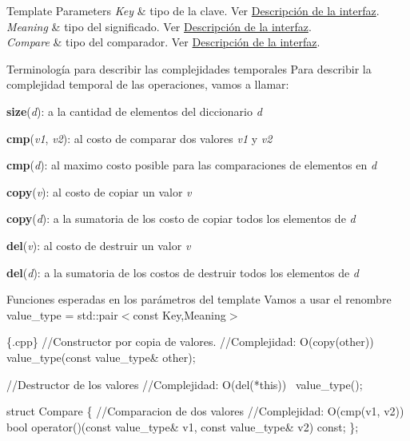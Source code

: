 \begin{DoxyTemplParams}{\-Template Parameters}
{\em \-Key} & tipo de la clave. \-Ver \hyperlink{Interfaz}{\-Descripción de la interfaz}. \\
\hline
{\em \-Meaning} & tipo del significado. \-Ver \hyperlink{Interfaz}{\-Descripción de la interfaz}. \\
\hline
{\em \-Compare} & tipo del comparador. \-Ver \hyperlink{Interfaz}{\-Descripción de la interfaz}.\\
\hline
\end{DoxyTemplParams}
\begin{DoxyParagraph}{\-Terminología para describir las complejidades temporales}
\-Para describir la complejidad temporal de las operaciones, vamos a llamar\-:
\begin{DoxyItemize}
\item {\bfseries size}({\itshape d\/})\-: a la cantidad de elementos del diccionario {\itshape d\/} 
\item {\bfseries cmp}({\itshape v1\/}, {\itshape v2\/})\-: al costo de comparar dos valores {\itshape v1\/} y {\itshape v2\/} 
\item {\bfseries cmp}({\itshape d\/})\-: al maximo costo posible para las comparaciones de elementos en {\itshape d\/} 
\item {\bfseries copy}({\itshape v\/})\-: al costo de copiar un valor {\itshape v\/} 
\item {\bfseries copy}({\itshape d\/})\-: a la sumatoria de los costo de copiar todos los elementos de {\itshape d\/} 
\item {\bfseries del}({\itshape v\/})\-: al costo de destruir un valor {\itshape v\/} 
\item {\bfseries del}({\itshape d\/})\-: a la sumatoria de los costos de destruir todos los elementos de {\itshape d\/} 
\end{DoxyItemize}
\end{DoxyParagraph}
\begin{DoxyParagraph}{\-Funciones esperadas en los parámetros del template}
\-Vamos a usar el renombre value\-\_\-type = std\-::pair$<$const Key,\-Meaning$>$
\end{DoxyParagraph}

\begin{DoxyCode}
 \{.cpp\}
 \textcolor{comment}{//Constructor por copia de valores.}
 \textcolor{comment}{//Complejidad: O(copy(other))}
 value\_type(\textcolor{keyword}{const} value\_type& other);

 \textcolor{comment}{//Destructor de los valores}
 \textcolor{comment}{//Complejidad: O(del(*this))}
 ~value\_type();

 \textcolor{keyword}{struct }Compare \{
   \textcolor{comment}{//Comparacion de dos valores}
   \textcolor{comment}{//Complejidad: O(cmp(v1, v2))}
   \textcolor{keywordtype}{bool} operator()(\textcolor{keyword}{const} value\_type& v1, \textcolor{keyword}{const} value\_type& v2) \textcolor{keyword}{const};
 \};
\end{DoxyCode}
 

